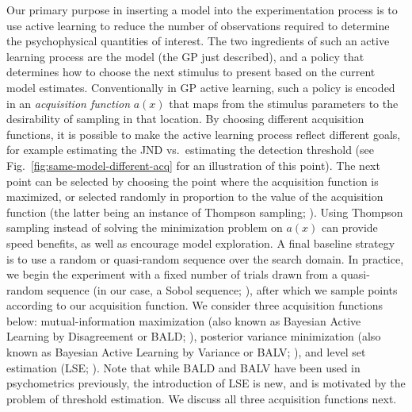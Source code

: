 \documentclass[../main.tex]{subfiles}
\begin{document}
Our primary purpose in inserting a model into the experimentation process is to use active learning to reduce the number of observations required to determine the psychophysical quantities of interest. The two ingredients of such an active learning process are the model (the GP just described), and a policy that determines how to choose the next stimulus to present based on the current model estimates.
Conventionally in GP active learning, such a policy is encoded in an \emph{acquisition function} $a(x)$ that maps from the stimulus parameters to the desirability of sampling in that location. By choosing different acquisition functions, it is possible to make the active learning process reflect different goals, for example estimating the JND vs.\ estimating the detection threshold (see Fig.~\ref{fig:same-model-different-acq} for an illustration of this point). The next point can be selected by choosing the point where the acquisition function is maximized, or selected randomly in proportion to the value of the acquisition function (the latter being an instance of Thompson sampling; \cite{Thompson1933}). Using Thompson sampling instead of solving the minimization problem on $a(x)$ can provide speed benefits, as well as encourage model exploration. A final baseline strategy is to use a random or quasi-random sequence over the search domain. In practice, we begin the experiment with a fixed number of trials drawn from a quasi-random sequence (in our case, a Sobol sequence; \cite{Sobol1967}), after which we sample points according to our acquisition function. We consider three acquisition functions below: mutual-information maximization (also known as Bayesian Active Learning by Disagreement or BALD; \cite{Houlsby2011}), posterior variance minimization (also known as Bayesian Active Learning by Variance or BALV; \cite{Settles2009}), and level set estimation (LSE; \cite{Gotovos2013}). Note that while BALD and BALV have been used in psychometrics previously, the introduction of LSE is new, and is motivated by the problem of threshold estimation. We discuss all three acquisition functions next.
\end{document}

